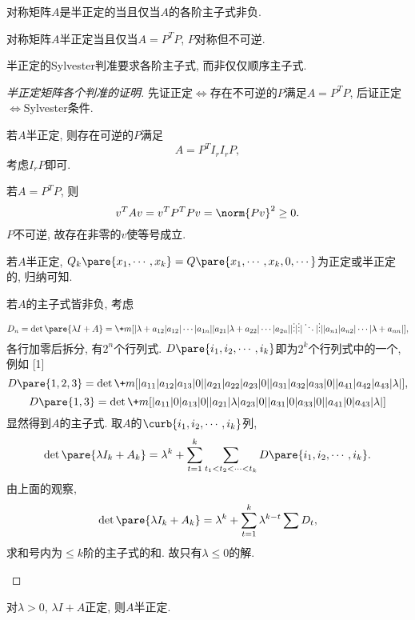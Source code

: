 \documentclass[hidelinks]{ctexart}
\begin{document}
\begin{theorem}[Sylvester判准]
    对称矩阵$A$是半正定的当且仅当$A$的各阶主子式非负.
\end{theorem}
\begin{proposition}
    对称矩阵$A$半正定当且仅当$A=P^T P$, $P$对称但不可逆.
\end{proposition}
\begin{pitfall}
    半正定的Sylvester判准要求各阶主子式, 而非仅仅顺序主子式.
\end{pitfall}
\begin{proof}[半正定矩阵各个判准的证明]
    先证正定$\Leftrightarrow$存在不可逆的$P$满足$A=P^TP$,
    后证正定$\Leftrightarrow$Sylvester条件.
    \begin{cenum}
        \item 若$A$半正定, 则存在可逆的$P$满足
        \[ A = P^T I_r I_r P, \]
        考虑$I_r P$即可.
        \item 若$A=P^TP$, 则
        \[ v^T A v = v^TP^T Pv = \norm{Pv}^2 \ge 0. \]
        $P$不可逆, 故存在非零的$v$使等号成立.
        \item 若$A$半正定, $Q_k\pare{x_1,\cdots,x_k} = Q\pare{x_1,\cdots,x_k,0,\cdots}$为正定或半正定的, 归纳可知.
        \item 若$A$的主子式皆非负, 考虑
        \[ D_n = \det\pare{\lambda I +A} = \+m[
        | \lambda+a_{12} | a_{12}         | \cdots | a_{1n}         |
        | a_{21}         | \lambda+a_{22} | \cdots | a_{2n}         |
        | \vdots         | \vdots         | \ddots | \vdots         |
        | a_{n1}         | a_{n2}         | \cdots | \lambda+a_{nn} |
        ],
        \]
        各行加零后拆分, 有$2^n$个行列式. $D\pare{i_1,i_2,\cdots,i_k}$即为$2^k$个行列式中的一个, 例如
        \leavevmode {}[1]
        \[ D\pare{1,2,3} = \det\+m[
        | a_{11} | a_{12} | a_{13} | 0       |
        | a_{21} | a_{22} | a_{23} | 0       |
        | a_{31} | a_{32} | a_{33} | 0       |
        | a_{41} | a_{42} | a_{43} | \lambda |
        ],
        \]
        \leavevmode
        \[ D\pare{1,3} = \det\+m[
        | a_{11} | 0       | a_{13} | 0       |
        | a_{21} | \lambda | a_{23} | 0       |
        | a_{31} | 0       | a_{33} | 0       |
        | a_{41} | 0       | a_{43} | \lambda |
        ] \]
        显然得到$A$的主子式. 取$A$的$\curb{i_1,i_2,\cdots,i_k}$列,
        \[ \det\pare{\lambda I_k +A_k} = \lambda^k + \sum_{t=1}^k\sum_{t_1<t_2<\cdots<t_k} D\pare{i_1,i_2,\cdots,i_k}. \]
        由上面的观察,
        \[ \det\pare{\lambda I_k + A_k} = \lambda^k + \sum_{t=1}^k\lambda^{k-t} \sum D_t, \]
        求和号内为$\le k$阶的主子式的和. 故只有$\lambda \le 0$的解.
        \qedhere
    \end{cenum}
\end{proof}
\begin{corollary}
    对$\lambda>0$, $\lambda I+A$正定, 则$A$半正定.
\end{corollary}




\end{document}
